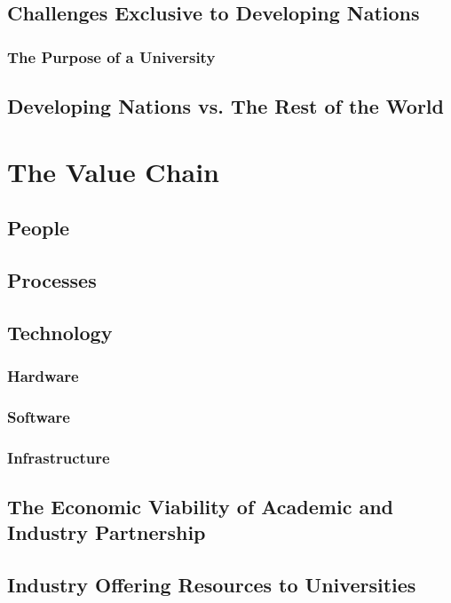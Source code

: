 \subsection{Challenges Exclusive to Developing Nations}
\subsubsection{The Purpose of a University}
\subsection{Developing Nations vs. The Rest of the World}
\section{The Value Chain}
\subsection{People}
\subsection{Processes}
\subsection{Technology}
\subsubsection{Hardware}
\subsubsection{Software}
\subsubsection{Infrastructure}
\subsection{The Economic Viability of Academic and Industry Partnership}
\subsection{Industry Offering Resources to Universities}

